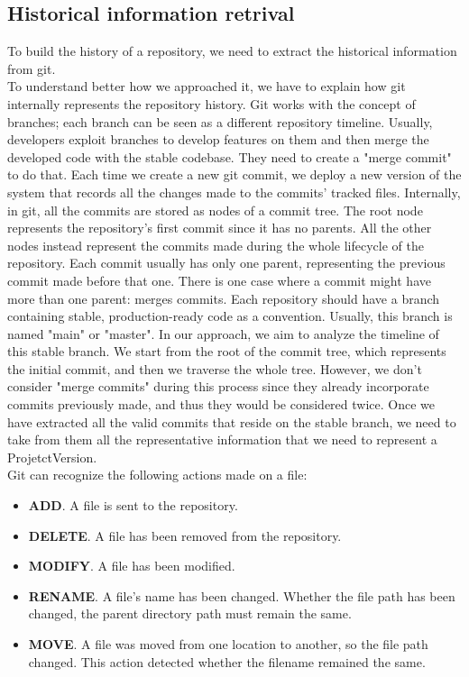 \subsection*{Historical information retrival}
To build the history of a repository, we need to extract the historical information from git.\\
\bigbreak
To understand better how we approached it, we have to explain how git internally represents the repository history. 
Git works with the concept of branches; each branch can be seen as a different repository timeline.
Usually, developers exploit branches to develop features on them and then merge the developed code with the stable codebase.
They need to create a "merge commit" to do that. 
Each time we create a new git commit, we deploy a new version of the system that records all the changes made to the commits' tracked files. 
Internally, in git, all the commits are stored as nodes of a commit tree. 
The root node represents the repository's first commit since it has no parents. 
All the other nodes instead represent the commits made during the whole lifecycle of the repository. 
Each commit usually has only one parent, representing the previous commit made before that one.
There is one case where a commit might have more than one parent: merges commits.
\bigbreak
Each repository should have a branch containing stable, production-ready code as a convention. Usually, this branch is named "main" or "master". 
In our approach, we aim to analyze the timeline of this stable branch. We start from the root of the commit tree, which represents the initial commit, and then we traverse the whole tree. 
However, we don't consider "merge commits" during this process since they already incorporate commits previously made, and thus they would be considered twice. 
Once we have extracted all the valid commits that reside on the stable branch, we need to take from them all the representative information that we need to represent a ProjetctVersion. \\
\bigbreak
Git can recognize the following actions made on a file:
\begin{itemize}
    \item \textbf{ADD}. A file is sent to the repository.
    \item \textbf{DELETE}. A file has been removed from the repository.
    \item \textbf{MODIFY}. A file has been modified.
    \item \textbf{RENAME}. A file's name has been changed. Whether the file path has been changed, the parent directory path must remain the same. 
    \item \textbf{MOVE}. A file was moved from one location to another, so the file path changed. This action detected whether the filename remained the same. 
\end{itemize}

